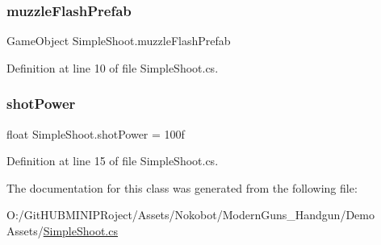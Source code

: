 \mbox{\label{class_simple_shoot_afd2c2e1225dc098740ccee326dbad174}} 
\subsubsection{\texorpdfstring{muzzleFlashPrefab}{muzzleFlashPrefab}}
{\footnotesize\ttfamily Game\+Object Simple\+Shoot.\+muzzle\+Flash\+Prefab}



Definition at line 10 of file Simple\+Shoot.\+cs.

\mbox{\label{class_simple_shoot_af962ecc5f24c7ea0d8a77c36abe0c02f}} 
\subsubsection{\texorpdfstring{shotPower}{shotPower}}
{\footnotesize\ttfamily float Simple\+Shoot.\+shot\+Power = 100f}



Definition at line 15 of file Simple\+Shoot.\+cs.



The documentation for this class was generated from the following file\+:\begin{DoxyCompactItemize}
\item 
O\+:/\+Git\+H\+U\+B\+M\+I\+N\+I\+P\+Roject/\+Assets/\+Nokobot/\+Modern\+Guns\+\_\+\+Handgun/\+Demo Assets/\mbox{\hyperlink{_simple_shoot_8cs}{Simple\+Shoot.\+cs}}\end{DoxyCompactItemize}

